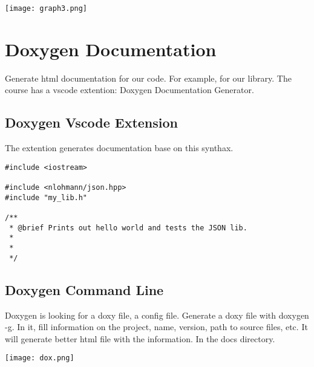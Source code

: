 \documentclass[openany]{report}
\begin{document}
\begin{center}
    \texttt{[image: graph3.png]}
\end{center}

\section{Doxygen Documentation}

Generate html documentation for our code. For example, for our library. The course has a vscode extention: Doxygen Documentation Generator.

\subsection{Doxygen Vscode Extension}

The extention generates documentation base on this synthax.

\begin{verbatim}
#include <iostream>

#include <nlohmann/json.hpp>
#include "my_lib.h"

/**
 * @brief Prints out hello world and tests the JSON lib.
 *
 *
 */
\end{verbatim}

\subsection{Doxygen Command Line}

Doxygen is looking for a doxy file, a config file. Generate a doxy file with doxygen -g.
In it, fill information on the project, name, version,  path to source files, etc. It will generate better html file with the information.
In the docs directory.

\begin{center}
    \texttt{[image: dox.png]}
\end{center}
\end{document}
